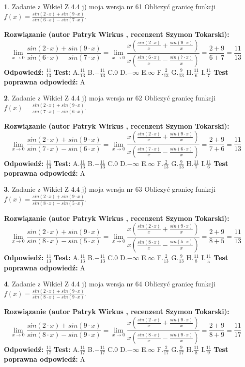 \documentclass[12pt, a4paper]{article}
\theoremstyle{definition} %
\newtheorem{zad}{}
\newcommand{\zadStart}[1]{\begin{zad}#1\newline}
\newcommand{\zadStop}{\end{zad}}
\newcommand{\rozwStart}[2]{\noindent \textbf{Rozwiązanie (autor #1 , recenzent #2): }\newline}
\newcommand{\rozwStop}{\newline}
\newcommand{\odpStart}{\noindent \textbf{Odpowiedź:}\newline}
\newcommand{\odpStop}{\newline}
\newcommand{\testStart}{\noindent \textbf{Test:}\newline}
\newcommand{\testStop}{\newline}
\newcommand{\kluczStart}{\noindent \textbf{Test poprawna odpowiedź:}\newline}
\newcommand{\kluczStop}{\newline}
\begin{document}
\zadStart{Zadanie z Wikieł Z 4.4 j) moja wersja nr 61}
Obliczyć granicę funkcji $f(x)=\frac{sin(2\cdot x) +sin(9\cdot x)}{sin(6\cdot x) -sin(7\cdot x)}$.
\zadStop
\rozwStart{Patryk Wirkus}{Szymon Tokarski}
$$\lim\limits_{x\to 0}\frac{sin(2\cdot x) +sin(9\cdot x)}{sin(6\cdot x) -sin(7\cdot x)}=\lim\limits_{x\to 0}\frac{x(\frac{sin(2\cdot x)}{x}+\frac{sin(9\cdot x)}{x})}{x(\frac{sin(6\cdot x)}{x}-\frac{sin(7\cdot x)}{x})}=\frac{2+9}{6+7} = \frac{11}{13}$$
\rozwStop
\odpStart
$\frac{11}{13}$
\odpStop
\testStart
A.$\frac{11}{13}$
B.$-\frac{11}{13}$
C.$0$
D.$-\infty$
E.$\infty$
F.$\frac{2}{13}$
G.$\frac{9}{13}$
H.$\frac{11}{6}$
I.$\frac{11}{7}$
\testStop
\kluczStart
A
\kluczStop



\zadStart{Zadanie z Wikieł Z 4.4 j) moja wersja nr 62}
Obliczyć granicę funkcji $f(x)=\frac{sin(2\cdot x) +sin(9\cdot x)}{sin(7\cdot x) -sin(6\cdot x)}$.
\zadStop
\rozwStart{Patryk Wirkus}{Szymon Tokarski}
$$\lim\limits_{x\to 0}\frac{sin(2\cdot x) +sin(9\cdot x)}{sin(7\cdot x) -sin(6\cdot x)}=\lim\limits_{x\to 0}\frac{x(\frac{sin(2\cdot x)}{x}+\frac{sin(9\cdot x)}{x})}{x(\frac{sin(7\cdot x)}{x}-\frac{sin(6\cdot x)}{x})}=\frac{2+9}{7+6} = \frac{11}{13}$$
\rozwStop
\odpStart
$\frac{11}{13}$
\odpStop
\testStart
A.$\frac{11}{13}$
B.$-\frac{11}{13}$
C.$0$
D.$-\infty$
E.$\infty$
F.$\frac{2}{13}$
G.$\frac{9}{13}$
H.$\frac{11}{7}$
I.$\frac{11}{6}$
\testStop
\kluczStart
A
\kluczStop



\zadStart{Zadanie z Wikieł Z 4.4 j) moja wersja nr 63}
Obliczyć granicę funkcji $f(x)=\frac{sin(2\cdot x) +sin(9\cdot x)}{sin(8\cdot x) -sin(5\cdot x)}$.
\zadStop
\rozwStart{Patryk Wirkus}{Szymon Tokarski}
$$\lim\limits_{x\to 0}\frac{sin(2\cdot x) +sin(9\cdot x)}{sin(8\cdot x) -sin(5\cdot x)}=\lim\limits_{x\to 0}\frac{x(\frac{sin(2\cdot x)}{x}+\frac{sin(9\cdot x)}{x})}{x(\frac{sin(8\cdot x)}{x}-\frac{sin(5\cdot x)}{x})}=\frac{2+9}{8+5} = \frac{11}{13}$$
\rozwStop
\odpStart
$\frac{11}{13}$
\odpStop
\testStart
A.$\frac{11}{13}$
B.$-\frac{11}{13}$
C.$0$
D.$-\infty$
E.$\infty$
F.$\frac{2}{13}$
G.$\frac{9}{13}$
H.$\frac{11}{8}$
I.$\frac{11}{5}$
\testStop
\kluczStart
A
\kluczStop



\zadStart{Zadanie z Wikieł Z 4.4 j) moja wersja nr 64}
Obliczyć granicę funkcji $f(x)=\frac{sin(2\cdot x) +sin(9\cdot x)}{sin(8\cdot x) -sin(9\cdot x)}$.
\zadStop
\rozwStart{Patryk Wirkus}{Szymon Tokarski}
$$\lim\limits_{x\to 0}\frac{sin(2\cdot x) +sin(9\cdot x)}{sin(8\cdot x) -sin(9\cdot x)}=\lim\limits_{x\to 0}\frac{x(\frac{sin(2\cdot x)}{x}+\frac{sin(9\cdot x)}{x})}{x(\frac{sin(8\cdot x)}{x}-\frac{sin(9\cdot x)}{x})}=\frac{2+9}{8+9} = \frac{11}{17}$$
\rozwStop
\odpStart
$\frac{11}{17}$
\odpStop
\testStart
A.$\frac{11}{17}$
B.$-\frac{11}{17}$
C.$0$
D.$-\infty$
E.$\infty$
F.$\frac{2}{17}$
G.$\frac{9}{17}$
H.$\frac{11}{8}$
I.$\frac{11}{9}$
\testStop
\kluczStart
A
\kluczStop
\end{document}
